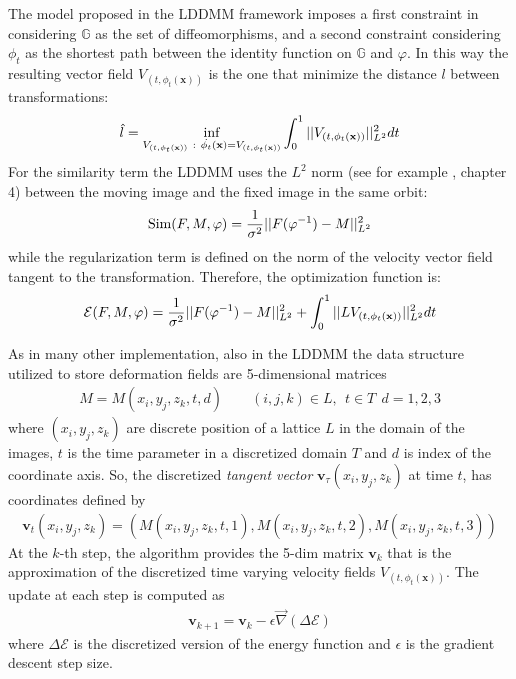 The model proposed in the LDDMM framework imposes a first constraint in considering $\mathbb{G}$ as the set of diffeomorphisms, and a second constraint considering $\phi_{t}$ as the shortest path between the identity function on $\mathbb{G}$ and $\varphi$. In this way the resulting vector field $V_{(t,\phi_{t} (\mathbf{x}))}$ is the one that minimize the distance $l$ between transformations:
\begin{align*}
\hat{l} = \inf_{V_{(t,\phi_{t} (\mathbf{x}))} ~ : ~ \dot{\phi_{t}} (\mathbf{x}) = V_{(t,\phi_{t} (\mathbf{x}))}  
				       }
	\int_{0}^{1} \vert\lvert V_{(t,\phi_{t} (\mathbf{x}))} \rvert\vert_{L^2}^{2}dt
\end{align*}
For the similarity term the LDDMM uses the $L^{2}$ norm (see for example \cite{stein2009real}, chapter 4) between the moving image and the fixed image in the same orbit:
\begin{align*}
\text{Sim}(F,M,\varphi) = \frac{1}{\sigma^2}\vert\lvert F(\varphi^{-1})  - M   \rvert\vert_{L^{2}}^{2}
\end{align*}
while the regularization term is defined on the norm of the velocity vector field tangent to the transformation. Therefore, the optimization function is: 
\begin{align*}
\mathcal{E}(F, M, \varphi) 
= 
\frac{1}{\sigma^2}\vert\lvert F(\varphi^{-1})  - M   \rvert\vert_{L^{2}}^{2}
 +
\int_0^1 \vert\lvert L V_{(t,\phi_{t} (\mathbf{x}))}  \rvert\vert_{L^{2}}^{2} dt
\end{align*}

As in many other implementation, also in the LDDMM the data structure utilized to store deformation fields are 5-dimensional matrices
\begin{align}\label{eq:basic_data_structure}
M = M(x_i,y_j,z_k,t,d) \qquad (i,j,k)\in L , ~~ t \in T  ~~ d = 1,2,3
\end{align}
where $(x_i,y_j,z_k)$ are discrete position of a lattice $L$ in the domain of the images, $t$ is the time parameter in a discretized domain $T$ and $d$ is index of the coordinate axis. So, the discretized \emph{tangent vector} $\mathbf{v}_{\tau}(x_i,y_j,z_k)$ at time $t$, has coordinates defined by
\begin{align*}
\mathbf{v}_{t}(x_i,y_j,z_k) = (M(x_i,y_j,z_k,t ,1), M(x_i,y_j,z_k,t,2), M(x_i,y_j,z_k,t ,3))
\end{align*}
At the $k$-th step, the algorithm provides the 5-dim matrix $\mathbf{v}_{k}$ that is the approximation of the discretized time varying velocity fields $V_{(t,\phi_{t} (\mathbf{x}))}$. The update at each step is computed as
\begin{align*}
\mathbf{v}_{k+1} = \mathbf{v}_{k} - \epsilon \vec{\nabla} (\Delta\mathcal{E})
\end{align*}
where $\Delta\mathcal{E}$ is the discretized version of the energy function and $\epsilon$ is the gradient descent step size.\\

